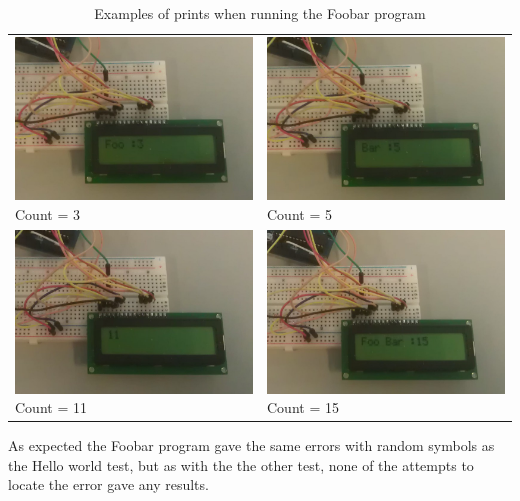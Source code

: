 \begin{table}[h]
\begin{tabular}{p{}p{}}
\includegraphics[width=8cm]{billeder/test_foobar_1.jpg}
Count = 3
 &
\includegraphics[width=8cm]{billeder/test_foobar_2.jpg}
Count = 5
\\ 
\includegraphics[width=8cm]{billeder/test_foobar_3.jpg}
Count = 11
 & 
\includegraphics[width=8cm]{billeder/test_foobar_4.jpg}
Count = 15
 \\ 
\end{tabular} 
\caption{Examples of prints when running the Foobar program}
\end{table}

As expected the Foobar program gave the same errors with random symbols as the Hello world test, but as with the the other test, none of the attempts to locate the error gave any results.